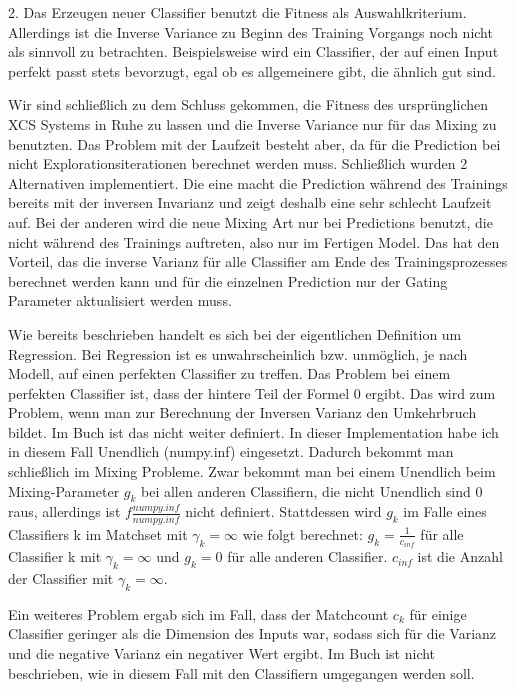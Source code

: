 \documentclass{ocsmnar}
\begin{document}
2. Das Erzeugen neuer Classifier benutzt die Fitness als Auswahlkriterium. Allerdings ist die Inverse Variance zu Beginn des Training Vorgangs noch nicht als sinnvoll zu betrachten. Beispielsweise wird ein Classifier, der auf einen Input perfekt passt stets bevorzugt, egal ob es allgemeinere gibt, die ähnlich gut sind. 

Wir sind schließlich zu dem Schluss gekommen, die Fitness des ursprünglichen XCS Systems in Ruhe zu lassen und die Inverse Variance nur für das Mixing zu benutzten. Das Problem mit der Laufzeit besteht aber, da für die Prediction bei nicht Explorationsiterationen berechnet werden muss. Schließlich wurden 2 Alternativen implementiert. Die eine macht die Prediction während des Trainings bereits mit der inversen Invarianz und zeigt deshalb eine sehr schlecht Laufzeit auf. Bei der anderen wird die neue Mixing Art nur bei Predictions benutzt, die nicht während des Trainings auftreten, also nur im Fertigen Model. Das hat den Vorteil, das die inverse Varianz für alle Classifier am Ende des Trainingsprozesses berechnet werden kann und für die einzelnen Prediction nur der Gating Parameter aktualisiert werden muss.  
 


Wie bereits beschrieben handelt es sich bei der eigentlichen Definition um Regression. Bei Regression ist es unwahrscheinlich bzw. unmöglich, je nach Modell, auf einen perfekten Classifier zu treffen. Das Problem bei einem perfekten Classifier ist, dass der hintere Teil der Formel 0 ergibt. Das wird zum Problem, wenn man zur Berechnung der Inversen Varianz den Umkehrbruch bildet. Im Buch ist das nicht weiter definiert. In dieser Implementation habe ich in diesem Fall Unendlich (numpy.inf) eingesetzt. Dadurch bekommt man schließlich im Mixing Probleme. Zwar bekommt man bei einem Unendlich beim Mixing-Parameter $g_{k}$ bei allen anderen Classifiern, die nicht Unendlich sind 0 raus, allerdings ist $f\frac{numpy.inf}{numpy.inf}$ nicht definiert. Stattdessen wird $g_{k}$ im Falle eines Classifiers k im Matchset mit $\gamma_{k} = \infty$ wie folgt berechnet: $g_{k} = \frac{1}{c_{inf}} $ für alle Classifier k mit $\gamma_{k} = \infty$ und $g_{k} = 0$ für alle anderen Classifier. $c_{inf}$ ist die Anzahl der Classifier mit $\gamma_{k} = \infty$.

Ein weiteres Problem ergab sich im Fall, dass der Matchcount $c_k$ für einige Classifier geringer als die Dimension des Inputs war, sodass sich für die Varianz und die negative Varianz ein negativer Wert ergibt. Im Buch ist nicht beschrieben, wie in diesem Fall mit den Classifiern umgegangen werden soll. %
\end{document}
